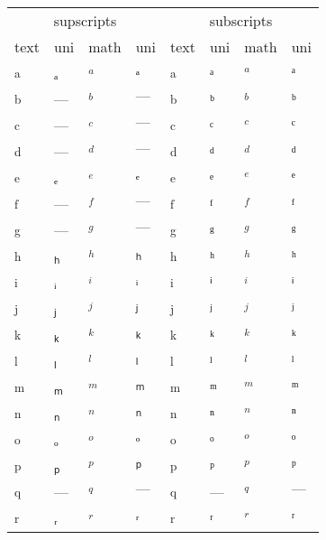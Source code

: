 \documentclass{standalone}
\begin{document}
\begin{tabular}{ll|ll|ll|ll}
\toprule
\multicolumn{4}{c|}{supscripts} & \multicolumn{4}{|c}{subscripts} \\
text & uni & math & uni & text & uni & math & uni \\
\midrule
\textsubscript{a} & ₐ & $_{a}$ & $ₐ$ & \textsuperscript{a} & ᵃ & $^{a}$ & $ᵃ$ \\
\textsubscript{b} & — & $_{b}$ & $—$ & \textsuperscript{b} & ᵇ & $^{b}$ & $ᵇ$ \\
\textsubscript{c} & — & $_{c}$ & $—$ & \textsuperscript{c} & ᶜ & $^{c}$ & $ᶜ$ \\
\textsubscript{d} & — & $_{d}$ & $—$ & \textsuperscript{d} & ᵈ & $^{d}$ & $ᵈ$ \\
\textsubscript{e} & ₑ & $_{e}$ & $ₑ$ & \textsuperscript{e} & ᵉ & $^{e}$ & $ᵉ$ \\
\textsubscript{f} & — & $_{f}$ & $—$ & \textsuperscript{f} & ᶠ & $^{f}$ & $ᶠ$ \\
\textsubscript{g} & — & $_{g}$ & $—$ & \textsuperscript{g} & ᵍ & $^{g}$ & $ᵍ$ \\
\textsubscript{h} & ₕ & $_{h}$ & $ₕ$ & \textsuperscript{h} & ʰ & $^{h}$ & $ʰ$ \\
\textsubscript{i} & ᵢ & $_{i}$ & $ᵢ$ & \textsuperscript{i} & ⁱ & $^{i}$ & $ⁱ$ \\
\textsubscript{j} & ⱼ & $_{j}$ & $ⱼ$ & \textsuperscript{j} & ʲ & $^{j}$ & $ʲ$ \\
\textsubscript{k} & ₖ & $_{k}$ & $ₖ$ & \textsuperscript{k} & ᵏ & $^{k}$ & $ᵏ$ \\
\textsubscript{l} & ₗ & $_{l}$ & $ₗ$ & \textsuperscript{l} & ˡ & $^{l}$ & $ˡ$ \\
\textsubscript{m} & ₘ & $_{m}$ & $ₘ$ & \textsuperscript{m} & ᵐ & $^{m}$ & $ᵐ$ \\
\textsubscript{n} & ₙ & $_{n}$ & $ₙ$ & \textsuperscript{n} & ⁿ & $^{n}$ & $ⁿ$ \\
\textsubscript{o} & ₒ & $_{o}$ & $ₒ$ & \textsuperscript{o} & ᵒ & $^{o}$ & $ᵒ$ \\
\textsubscript{p} & ₚ & $_{p}$ & $ₚ$ & \textsuperscript{p} & ᵖ & $^{p}$ & $ᵖ$ \\
\textsubscript{q} & — & $_{q}$ & $—$ & \textsuperscript{q} & — & $^{q}$ & $—$ \\
\textsubscript{r} & ᵣ & $_{r}$ & $ᵣ$ & \textsuperscript{r} & ʳ & $^{r}$ & $ʳ$ \\

\end{tabular}
\end{document}
